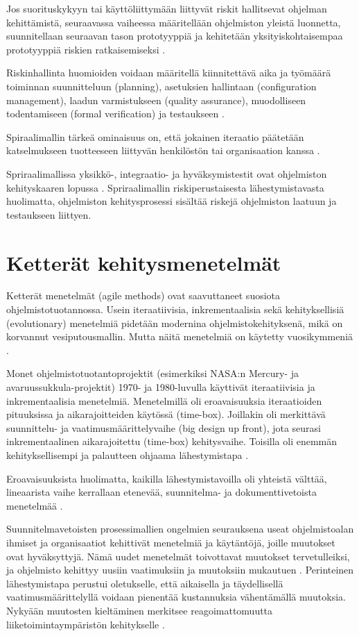 \documentclass[finnish]{tktltiki2}
\theoremstyle{definition}
\theoremstyle{remark}
\begin{document}
Jos suorituskykyyn tai käyttöliittymään liittyvät riskit hallitsevat ohjelman kehittämistä, seuraavassa vaiheessa määritellään ohjelmiston yleistä luonnetta, suunnitellaan seuraavan tason prototyyppiä ja kehitetään yksityiskohtaisempaa prototyyppiä riskien ratkaisemiseksi \cite{BOE88}.

Riskinhallinta huomioiden voidaan määritellä kiinnitettävä aika ja työmäärä toiminnan suunnitteluun (planning), asetuksien hallintaan (configuration management), laadun varmistukseen (quality assurance), muodolliseen todentamiseen (formal verification) ja testaukseen \cite{BOE88}.

Spiraalimallin tärkeä ominaisuus on, että jokainen iteraatio päätetään katselmukseen tuotteeseen liittyvän henkilöstön tai organisaation kanssa \cite{BOE88}.

Spriraalimallissa yksikkö-, integraatio- ja hyväksymis\-testit ovat ohjelmiston kehityskaaren lopussa \cite{BOE88}. Spriraalimallin riskiperustaisesta lähestymistavasta huolimatta, ohjelmiston kehitysprosessi sisältää riskejä ohjelmiston laatuun ja testaukseen liittyen. 

\section{Ketterät kehitysmenetelmät}

Ketterät menetelmät (agile methods) ovat saavuttaneet suosiota ohjelmistotuotannossa. Usein iteraatiivisia, inkrementaalisia sekä kehityksellisiä (evolutionary) menetelmiä pidetään modernina ohjelmistokehityksenä, mikä on korvannut vesiputousmallin. Mutta näitä menetelmiä on käytetty vuosikymmeniä \cite{LAB03}.

Monet ohjelmistotuotantoprojektit  (esimerkiksi NASA:n Mercury- ja avaruussukkula-projektit) 1970- ja 1980-luvulla käyttivät iteraatiivisia ja inkrementaalisia menetelmiä.  Menetelmillä oli eroavaisuuksia iteraatioiden pituuksissa ja aikarajoitteiden käytössä (time-box). Joillakin oli merkittävä suunnittelu- ja vaatimusmäärittelyvaihe (big design up front), jota seurasi inkrementaalinen aikarajoitettu (time-box) kehitysvaihe. Toisilla oli enemmän kehityksellisempi ja palautteen ohjaama lähestymistapa \cite{LAB03}.

Eroavaisuuksista huolimatta, kaikilla lähestymistavoilla oli yhteistä välttää, lineaarista vaihe kerrallaan etenevää, suunnitelma- ja dokumenttivetoista menetelmää \cite{LAB03}.

Suunnitelmavetoisten prosessimallien ongelmien seurauksena useat ohjelmistoalan ihmiset ja organisaatiot kehittivät menetelmiä ja käytäntöjä, joille muutokset ovat hyväksyttyjä. Nämä uudet menetelmät toivottavat muutokset tervetulleiksi, ja ohjelmisto kehittyy uusiin vaatimuksiin ja muutoksiin mukautuen \cite{WIC03}. Perinteinen lähestymistapa perustui oletukselle, että aikaisella ja täydellisellä vaatimusmäärittelyllä voidaan pienentää kustannuksia vähentämällä muutoksia. Nykyään muutosten kieltäminen merkitsee reagoimattomuutta liiketoimintaympäristön kehitykselle \cite{HIC01}.
\end{document}
